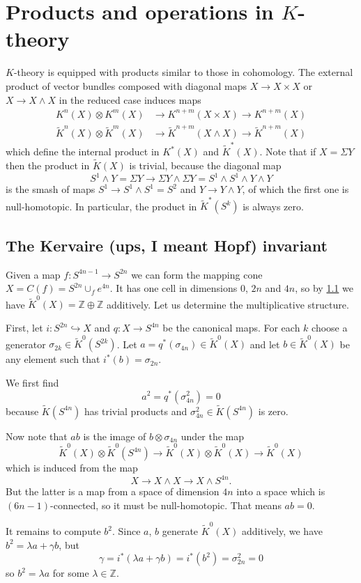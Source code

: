 \documentclass[a4paper,10pt]{article}
\theoremstyle{plain}%
\theoremstyle{definition}
\theoremstyle{remark}
\newcommand{\ZZ}{\mathbb{Z}}
\newcommand{\KR}{\widetilde{K}}   %
\newcommand{\smsh}{\wedge}  %
\newcommand{\susp}{\Sigma}  %
\begin{document}
\section{Products and operations in $K$-theory}

$K$-theory is equipped with products similar to those in cohomology. The external product of vector bundles composed with diagonal maps $X\to X\times X$ or $X\to X\smsh X$ in the reduced case induces maps
\begin{align*}
K^n(X)\otimes K^m(X)&\to K^{n+m}(X\times X)\to K^{n+m}(X)\\
\KR^n(X)\otimes \KR^m(X)&\to \KR^{n+m}(X\smsh X)\to \KR^{n+m}(X)
\end{align*}
which define the internal product in $K^*(X)$ and $\KR^*(X)$. Note that if $X=\susp Y$ then the product in $\KR(X)$ is trivial, because the diagonal map
$$S^1\smsh Y=\susp Y\to \susp Y\smsh \susp Y=S^1\smsh S^1\smsh Y\smsh Y$$
is the smash of maps $S^1\to S^1\smsh S^1=S^2$ and $Y\to Y\smsh Y$, of which the first one is null-homotopic. In particular, the product in $\KR^*(S^k)$ is always zero.

\subsection{The Kervaire (ups, I meant Hopf) invariant}
Given a map $f:S^{4n-1}\to S^{2n}$ we can form the mapping cone $X=C(f)=S^{2n}\cup_f e^{4n}$. It has one cell in dimensions $0$, $2n$ and $4n$, so by \ref{}  we have $\KR^0(X)=\ZZ\oplus\ZZ$ additively. Let us determine the multiplicative structure.

First, let $i:S^{2n}\hookrightarrow X$ and $q:X\to S^{4n}$ be the canonical maps. For each $k$ choose a generator $\sigma_{2k}\in \KR^0(S^{2k})$. Let $a=q^*(\sigma_{4n})\in\KR^0(X)$ and let $b\in\KR^0(X)$ be any element such that $i^*(b)=\sigma_{2n}$.

We first find
$$a^2=q^*(\sigma_{4n}^2)=0$$
because $\KR(S^{4n})$ has trivial products and $\sigma_{4n}^2\in \KR(S^{4n})$ is zero.

Now note that $ab$ is the image of $b\otimes \sigma_{4n}$ under the map
$$\KR^0(X)\otimes \KR^0(S^{4n})\to \KR^0(X)\otimes \KR^0(X) \to \KR^0(X)$$
which is induced from the map
$$X\to X\smsh X\to X\smsh S^{4n}.$$
But the latter is a map from a space of dimension $4n$ into a space which is $(6n-1)$-connected, so it must be null-homotopic. That means $ab=0$.

It remains to compute $b^2$. Since $a$, $b$ generate $\KR^0(X)$ additively, we have $b^2=\lambda a+\gamma b$, but
$$\gamma=i^*(\lambda a+\gamma b)=i^*(b^2)=\sigma_{2n}^2=0$$
so $b^2=\lambda a$ for some $\lambda\in\ZZ$.
\end{document}

